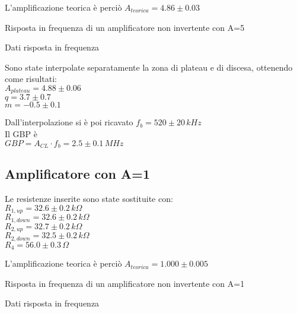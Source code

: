 L'amplificazione teorica è perciò
$A_{teorica} = 4.86 \pm 0.03$

\begin{grafico}
 \centering 
  
 \caption{Risposta in frequenza di un amplificatore non invertente con A=5} 
 \label{gr:amp_noninv_A5.tex} 
\end{grafico}

\begin{tabella}
 \centering
   
 \caption{Dati risposta in frequenza}
 \label{tab:tab_noninv_A5.tex}
\end{tabella}

Sono state interpolate separatamente la zona di plateau e di discesa, ottenendo come risultati:\\
$A_{plateau}=4.88 \pm 0.06$\\
$q = 3.7 \pm 0.7$\\
$m = -0.5 \pm 0.1$

Dall'interpolazione si è poi ricavato 
$f_b= 520 \pm 20 \,kHz $\\
Il GBP è\\
$GBP=A_{CL} \cdot f_b = 2.5 \pm 0.1 \,MHz$


\subsection{Amplificatore con A=1}
Le resistenze inserite sono state sostituite con:\\
$R_{1,up}=32.6 \pm 0.2 \,k\Omega $\\ %
$R_{1,down}=32.6 \pm 0.2\,k\Omega$\\ %
$R_{2,up}=32.7 \pm 0.2\,k\Omega$\\ %
$R_{2,down}=32.5 \pm 0.2\,k\Omega$\\
$R_4=56.0 \pm 0.3\,\Omega$

L'amplificazione teorica è perciò
$A_{teorica} = 1.000 \pm 0.005$

\begin{grafico}
 \centering 
  
 \caption{Risposta in frequenza di un amplificatore non invertente con A=1} 
 \label{gr:amp_noninv_A1.tex} 
\end{grafico}

\begin{tabella}
 \centering
  
 \caption{Dati risposta in frequenza}
 \label{tab:tab_noninv_A1.tex}
\end{tabella}

